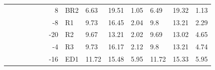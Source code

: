 {\begin{minipage}{\linewidth}
\begin{tabular}{l|l|l|l|c|c|r|l|lll|lll}
                                              &                                          &                                           &                                           & \multicolumn{1}{l|}{}                      &                                                                                         & 8                                                                                              & BR2                                       & 6.63  & 19.51 & 1.05      & 6.49  & 19.32 & 1.13       \\
                                              &                                          &                                           &                                           & \multicolumn{1}{l|}{}                      &                                                                                         & -8                                                                                             & R1                                        & 9.73  & 16.45 & 2.04      & 9.8   & 13.21 & 2.29       \\
                                              &                                          &                                           &                                           & \multicolumn{1}{l|}{}                      &                                                                                         & -20                                                                                            & R2                                        & 9.67  & 13.21 & 2.02      & 9.69  & 13.02 & 4.65       \\
                                              &                                          &                                           &                                           & \multicolumn{1}{l|}{}                      &                                                                                         & -4                                                                                             & R3                                        & 9.73  & 16.17 & 2.12      & 9.8   & 13.21 & 4.74       \\
                                              &                                          &                                           &                                           & \multicolumn{1}{l|}{}                      &                                                                                         & -16                                                                                            & ED1                                       & 11.72 & 15.48 & 5.95      & 11.72 & 15.33 & 5.95       \\

\end{tabular}
\end{minipage}}
